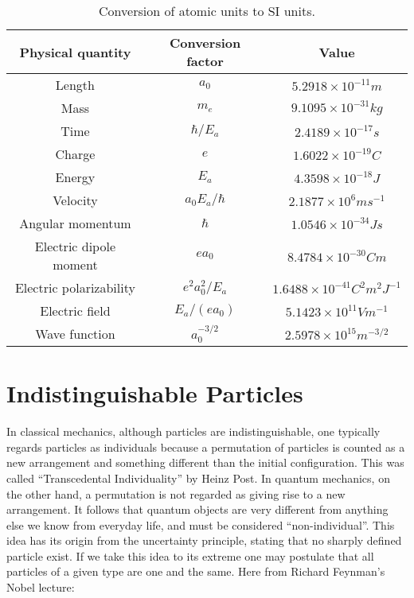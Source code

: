         \begin{table}
            \centering
            \caption{Conversion of atomic units to SI units.}
            \begin{tabular}{ccc} \hline
                Physical quantity & Conversion factor & Value \\ \hline
                Length  & $a_0$ & $5.2918 \times 10^{-11} m$ \\
                Mass    & $m_e$ & $9.1095 \times 10^{-31} kg$ \\
                Time    & $\hbar/E_a$ & $2.4189 \times 10^{-17} s$ \\
                Charge  & $e$   & $1.6022 \times 10^{-19} C$ \\
                Energy  & $E_a$ & $4.3598 \times 10^{-18} J$ \\
                Velocity& $a_0E_a/\hbar$ & $2.1877 \times 10^{6} ms^{-1}$ \\
                Angular momentum & $\hbar$ &  $1.0546 \times 10^{-34} Js$ \\
                Electric dipole moment & $ea_0$& $8.4784 \times 10^{-30} Cm$ \\
                Electric polarizability & $e^2a_0^2/E_a$ & $1.6488 \times 10^{-41} C^2m^2J^{-1}$ \\
                Electric field & $E_a/(ea_0)$ & $5.1423 \times 10^{11} Vm^{-1} $ \\
                Wave function & $a_0^{-3/2}$ & $2.5978 \times 10^{15} m^{-3/2}$ \\ \hline
            \end{tabular}
            \label{tab:atomic_units_conversion}
        \end{table}


\section{Indistinguishable Particles}

    In classical mechanics, although particles are indistinguishable, one typically
    regards particles as individuals because a permutation of particles is counted as
    a new arrangement and something different than the initial configuration. 
    This was called ``Transcedental
    Individuality'' by Heinz Post\cite{post1963individuality}. In quantum mechanics, on 
    the other hand, a permutation is not regarded as giving rise to a new 
    arrangement. It follows that quantum objects are very different from anything else we
    know from everyday life, and must be considered ``non-individual''. This 
    idea has its origin from the uncertainty principle, stating that no sharply defined 
    particle exist. If we take this idea
    to its extreme one may postulate that all particles of a given type are one and the
    same. Here from Richard Feynman's Nobel lecture\cite{feynman1965nobel}:

